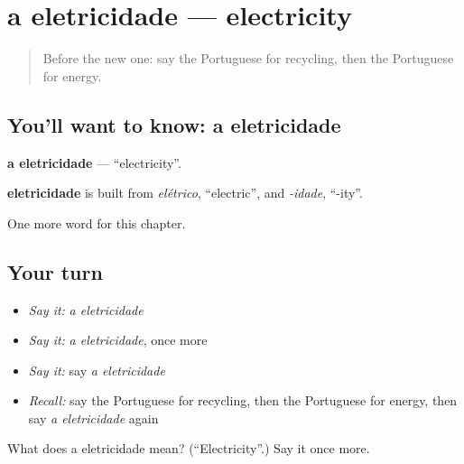 \section[a eletricidade]{a eletricidade — electricity}

\label{lesson:PT-C225-eletricidade}



\begin{quote}
Before the new one: say the Portuguese for recycling, then the Portuguese for energy.
\end{quote}

\subsection*{You'll want to know: a eletricidade}
\textbf{a eletricidade} — \textquotedblleft{}electricity\textquotedblright{}.

\begin{cousinweb}
\textbf{eletricidade} is built from \emph{elétrico}, \textquotedblleft{}electric\textquotedblright{}, and \emph{-idade}, \textquotedblleft{}-ity\textquotedblright{}.
\end{cousinweb}

\begin{grammarlens}[title={What you've built}]
One more word for this chapter.
\end{grammarlens}

\subsection*{Your turn}
\begin{itemize}
\raggedright
  \item \emph{Say it:} \emph{a eletricidade}
  \item \emph{Say it:} \emph{a eletricidade}, once more
  \item \emph{Say it:} say \emph{a eletricidade}
  \item \emph{Recall:} say the Portuguese for recycling, then the Portuguese for energy, then say \emph{a eletricidade} again
\end{itemize}

\begin{tcolorbox}[breakable,colback=teal!4,colframe=teal!35!black,title={Before you move on}]
What does a eletricidade mean? (\textquotedblleft{}Electricity\textquotedblright{}.) Say it once more.
\end{tcolorbox}
